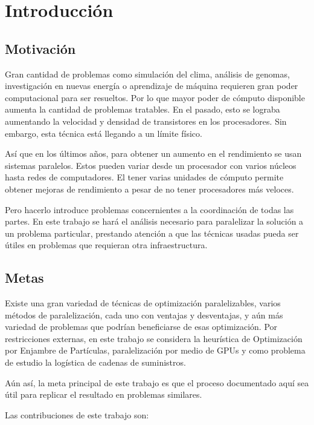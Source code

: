 \chapter{Introducción}\label{cap:intro}

\section{Motivación}

Gran cantidad de problemas como simulación del clima, análisis de genomas,
investigación en nuevas energía o aprendizaje de máquina\cite{Pacheco2011}
requieren gran poder computacional para ser resueltos. Por lo que mayor poder
de cómputo disponible aumenta la cantidad de problemas tratables. En el pasado,
esto se lograba aumentando la velocidad y densidad de transistores en los
procesadores. Sin embargo, esta técnica está llegando a un límite físico.

Así que en los últimos años, para obtener un aumento en el rendimiento se usan
sistemas paralelos. Estos pueden variar desde un procesador con varios núcleos
hasta redes de computadores. El tener varias unidades de cómputo permite
obtener mejoras de rendimiento a pesar de no tener procesadores más veloces.

Pero hacerlo introduce problemas concernientes a la coordinación de todas las
partes. En este trabajo se hará el análisis necesario para paralelizar la
solución a un problema particular, prestando atención a que las técnicas usadas
pueda ser útiles en problemas que requieran otra infraestructura.

\section{Metas}

Existe una gran variedad de técnicas de optimización paralelizables, varios
métodos de paralelización, cada uno con ventajas y desventajas, y aún más
variedad de problemas que podrían beneficiarse de esas optimización. Por
restricciones externas, en este trabajo se considera la heurística de
Optimización por Enjambre de Partículas, paralelización por medio de GPUs y
como problema de estudio la logística de cadenas de suministros.

Aún así, la meta principal de este trabajo es que el proceso documentado aquí
sea útil para replicar el resultado en problemas similares.

Las contribuciones de este trabajo son:

